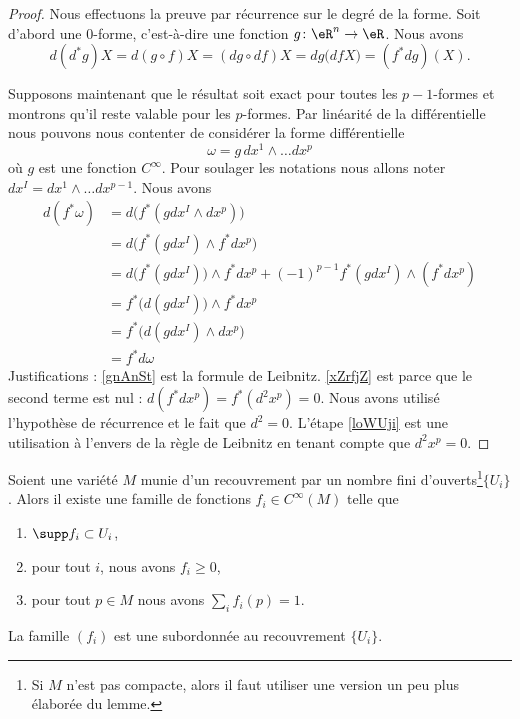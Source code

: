 \begin{proof}
    Nous effectuons la preuve par récurrence sur le degré de la forme. Soit d'abord une \( 0\)-forme, c'est-à-dire une fonction \( g\colon \eR^n\to \eR\). Nous avons
    \begin{equation}
        d(d^*g)X=d(g\circ f)X=(dg\circ df)X=dg\big( df X \big)=(f^*dg)(X).
    \end{equation}

    Supposons maintenant que le résultat soit exact pour toutes les \( p-1\)-formes et montrons qu'il reste valable pour les \( p\)-formes. Par linéarité de la différentielle nous pouvons nous contenter de considérer la forme différentielle
    \begin{equation}
        \omega=g\,dx^1\wedge\ldots dx^p
    \end{equation}
    où \( g\) est une fonction \(  C^{\infty}\). Pour soulager les notations nous allons noter \( dx^I=dx^1\wedge\ldots dx^{p-1}\). Nous avons
    \begin{subequations}
        \begin{align}
            d(f^*\omega)&=d\big( f^*(gdx^I\wedge dx^p) \big)\\
            &=d\big( f^*(gdx^I)\wedge f^*dx^p \big)\\
            &=d\big( f^*(gdx^I)\big)\wedge f^*dx^p+(-1)^{p-1}f^*(gdx^I)\wedge(f^*dx^p)  \label{gnAnSt}\\
            &=f^*\big( d(gdx^I) \big)\wedge f^*dx^p      \label{xZrfjZ}\\
            &=f^*\big( d(gdx^I)\wedge dx^p \big)\\
            &=f^*d\omega        \label{loWUji}
        \end{align}
    \end{subequations}
    Justifications : \eqref{gnAnSt} est la formule de Leibnitz. \eqref{xZrfjZ} est parce que le second terme est nul : \( d(f^*dx^p)=f^*(d^2x^p)=0\). Nous avons utilisé l'hypothèse de récurrence et le fait que \( d^2=0\). L'étape \eqref{loWUji} est une utilisation à l'envers de la règle de Leibnitz en tenant compte que \( d^2x^p=0\).
\end{proof}


\begin{lemmaDef}   \label{LemGPmRGZ}
    Soient une variété \( M\) munie d'un recouvrement par un nombre fini d'ouverts\footnote{Si \( M\) n'est pas compacte, alors il faut utiliser une version un peu plus élaborée du lemme\cite{SpindelGeomDoff}.}\( \{ U_i \}\). Alors il existe une famille de fonctions \( f_i\in  C^{\infty}(M)\) telle que
    \begin{enumerate}
        \item
            \( \supp f_i\subset U_i\),
        \item
            pour tout \( i\), nous avons \( f_i\geq 0\),
        \item
            pour tout \( p\in M\) nous avons \( \sum_i f_i(p)=1\).
    \end{enumerate}
\end{lemmaDef}
La famille \( (f_i)\) est une  subordonnée au recouvrement \( \{ U_i \}\).

